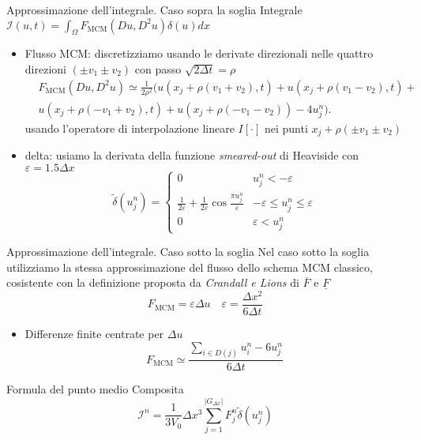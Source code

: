 \begin{frame}{Approssimazione dell'integrale. Caso sopra la soglia}
  Integrale $\mathcal{I}(u,t)=\int_{\Omega}F_{\text{MCM}}(Du,D^2u)\delta(u)dx$
  \begin{itemize}
    \item \alert{Flusso MCM}: discretizziamo usando le derivate direzionali
      nelle \alert{quattro} direzioni $(\pm v_1\pm v_2)$ con passo
      $\sqrt{2\Delta t}=\rho$
      \[
      \begin{aligned}
      &F_{\text{MCM}}(Du,D^2u)\simeq\frac{1}{2\rho^2}(u(x_j+\rho(v_1+v_2),t)+u(x_j+\rho(v_1-v_2),t)+\\ 
      &u(x_j+\rho(-v_1+v_2),t)+u(x_j+\rho(-v_1-v_2))-4u_j^n).
      \end{aligned}
      \]
      usando l'operatore di interpolazione lineare $I[\cdot]$ nei
      punti $x_j+\rho(\pm v_1\pm v_2)$ 
    \item \alert{delta}: usiamo la derivata della funzione
      \emph{smeared-out} di Heaviside con $\varepsilon=1.5\Delta x$
      \[
        \tilde{\delta}(u_j^n)=
        \begin{cases}
          0  &u_j^n<-\varepsilon \\
         \frac{1}{2\varepsilon}+\frac{1}{2\varepsilon}\cos{\frac{\pi
              u_j^n}{\varepsilon}} &-\varepsilon\leq u_j^n\leq\varepsilon \\
          0  &\varepsilon< u_j^n
        \end{cases}
        \] 
  \end{itemize}
\end{frame}
 
\begin{frame}{Approssimazione dell'integrale. Caso sotto la soglia}
  Nel caso sotto la soglia utilizziamo la stessa approssimazione del
  flusso dello schema MCM classico, cosistente con la definizione
  proposta da \emph{Crandall e Lions} di $\overline{F}$ e
  $\underline{F}$
  \[
  F_{\text{MCM}}=\varepsilon\Delta u\quad \varepsilon=\frac{\Delta
    x^2}{6\Delta t}
  \]
  \begin{itemize}
  \item Differenze finite centrate per $\Delta u$
    \[
    F_{\text{MCM}}\simeq\frac{\sum_{i\in D(j)}u_i^n -6u_j^n}{6\Delta t}
    \]
  \end{itemize}
  \begin{alertblock}{Formula del punto medio Composita}
    \[
    \mathcal{I}^n=\frac{1}{3V_0}\Delta x^3\sum_{j=1}^{|G_{\Delta x}|}F_j^n\tilde{\delta}(u_j^n)
    \]
  \end{alertblock}
\end{frame}

